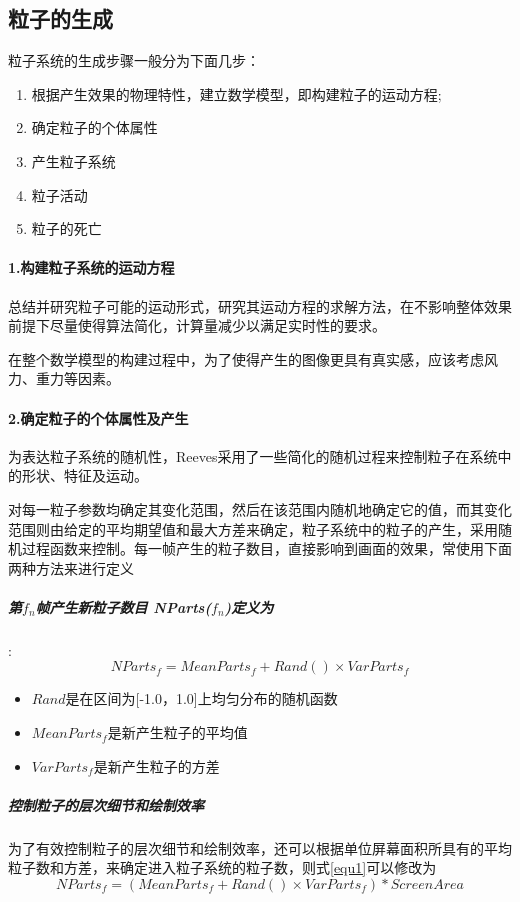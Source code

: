 \documentclass[UTF8,a4paper,14pt]{ctexart}
\begin{document}
	\subsection{粒子的生成}
		粒子系统的生成步骤一般分为下面几步：
		\begin{enumerate}[fullwidth,itemindent = 2em]
			\item 根据产生效果的物理特性，建立数学模型，即构建粒子的运动方程;
			\item 确定粒子的个体属性 
			\item 产生粒子系统
			\item 粒子活动
			\item 粒子的死亡
		\end{enumerate}
		\paragraph{1.构建粒子系统的运动方程}
			总结并研究粒子可能的运动形式，研究其运动方程的求解方法，在不影响整体效果前提下尽量使得算法简化，计算量减少以满足实时性的要求。
			
			在整个数学模型的构建过程中，为了使得产生的图像更具有真实感，应该考虑风力、重力等因素。
		\paragraph{2.确定粒子的个体属性及产生}
			为表达粒子系统的随机性，Reeves采用了一些简化的随机过程来控制粒子在系统中的形状、特征及运动。
			
			对每一粒子参数均确定其变化范围，然后在该范围内随机地确定它的值，而其变化范围则由给定的平均期望值和最大方差来确定，粒子系统中的粒子的产生，采用随机过程函数来控制。每一帧产生的粒子数目，直接影响到画面的效果，常使用下面两种方法来进行定义
			\subparagraph{第$f_n$帧产生新粒子数目 NParts($f_n$)定义为}:
				\begin{equation}\label{equ1}
					NParts_f=MeanParts_f+Rand()×VarParts_f 
				\end{equation}
				
				\begin{itemize}
					\item $Rand$是在区间为[-1.0，1.0]上均匀分布的随机函数
					\item $MeanParts_f$是新产生粒子的平均值
					\item $VarParts_f$是新产生粒子的方差
				\end{itemize}
				
			\subparagraph{控制粒子的层次细节和绘制效率}
				为了有效控制粒子的层次细节和绘制效率，还可以根据单位屏幕面积所具有的平均粒子数和方差，来确定进入粒子系统的粒子数，则式\ref{equ1}可以修改为
				\begin{equation}\label{equ2}
					NParts_f=(MeanParts_f+Rand()×VarParts_f)* ScreenArea
				\end{equation}
				
\end{document}
